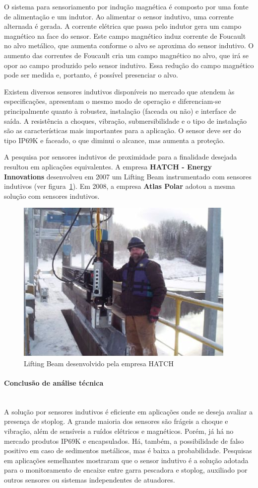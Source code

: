  O sistema para sensoriamento por indução magnética é composto por uma fonte de alimentação e um indutor. Ao alimentar o sensor indutivo, uma corrente alternada é gerada. A corrente elétrica que passa pelo indutor gera um campo magnético na face do sensor. Este campo magnético induz corrente de Foucault no alvo metálico, que aumenta conforme o alvo se aproxima do sensor indutivo. O aumento das correntes de Foucault cria um campo magnético no alvo, que irá se opor ao campo produzido pelo sensor indutivo. Essa redução do campo magnético pode ser medida e, portanto, é possível presenciar o alvo.

 Existem diversos sensores indutivos disponíveis no mercado que atendem às especificações, apresentam o mesmo modo de operação e diferenciam-se principalmente quanto à robustez, instalação (faceada ou não) e interface de saída. A resistência a choques, vibração, submersibilidade e o tipo de instalação são as características mais importantes para a aplicação. O sensor deve ser do tipo IP69K e faceado, o que diminui o alcance, mas aumenta a proteção.

 A pesquisa por sensores indutivos de proximidade para a finalidade desejada resultou em aplicações equivalentes. A empresa \textbf{HATCH - Energy Innovations} desenvolveu em 2007 um Lifting Beam instrumentado com sensores indutivos (ver figura~\ref{indutivo_1}). Em 2008, a empresa \textbf{Atlas Polar} adotou a mesma solução com sensores indutivos.

 \begin{figure}[H]
    \centering
    \includegraphics[width=0.5\columnwidth]{figs/indutivo/1.jpg}
    \caption{Lifting Beam desenvolvido pela empresa HATCH}
    \label{indutivo_1}
\end{figure}

 \paragraph{Conclusão de análise técnica}\mbox{}\\
A solução por sensores indutivos é eficiente em aplicações onde se deseja avaliar a presença de stoplog. A grande maioria dos sensores são frágeis a choque e vibração, além de sensíveis a ruídos elétricos e magnéticos. Porém, já há no mercado produtos IP69K e encapsulados. Há, também, a possibilidade de falso positivo em caso de sedimentos metálicos, mas é baixa a probabilidade.
Pesquisas em aplicações semelhantes mostraram que o sensor indutivo é a solução adotada para o monitoramento de encaixe entre garra pescadora e stoplog, auxiliado por outros sensores ou sistemas independentes de atuadores.

